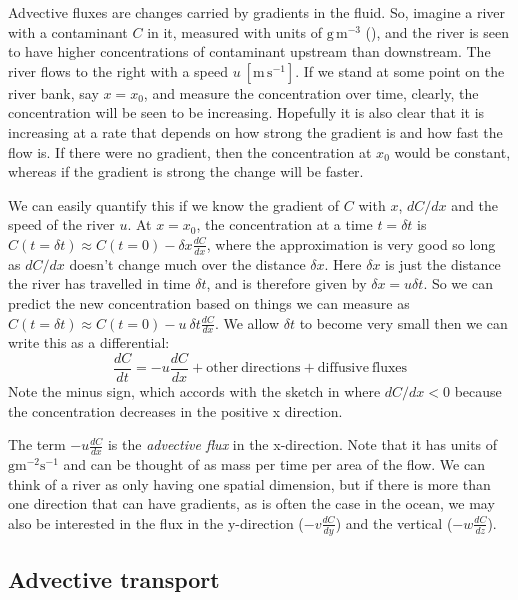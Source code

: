 Advective fluxes are changes carried by gradients in the fluid.  So, imagine a river with a contaminant $C$ in it, measured with units of $\mathrm{g\,m^{-3}}$ (), and the river is seen to have higher concentrations of contaminant upstream than downstream.    The river flows to the right with a speed $u\ \mathrm{[m\,s^{-1}]}$.   If we stand at some point on the river bank, say $x = x_0$, and measure the concentration over time, clearly, the concentration will be seen to be increasing.  Hopefully it is also clear that it is increasing at a rate that depends on how strong the gradient is and how fast the flow is.  If there were no gradient, then the concentration at $x_0$ would be constant, whereas if the gradient is strong the change will be faster.  

We can easily quantify this if we know the gradient of $C$ with $x$, $dC/dx$ and the speed of the river $u$.  At $x=x_0$, the concentration at a time $t=\delta t$ is
$C(t=\delta t) \approx C(t=0) - \delta x \frac{dC}{dx}$, where the approximation is very good so long as $dC/dx$ doesn't change much over the distance $\delta x$.  Here $\delta x$ is just the distance the river has travelled in time $\delta t$, and is therefore given by $\delta x = u \delta t$.  So we can predict the new concentration based on things we can measure as  $C(t=\delta t) \approx C(t=0) - u\ \delta t \frac{dC}{dx}$.  We allow $\delta t$ to become very small then we can write this as a differential:
\begin{equation}
\frac{dC}{dt} = -u \frac{dC}{dx} + \mathrm{other\ directions} + \mathrm{diffusive\ fluxes}    
\end{equation}
Note the minus sign, which accords with the sketch in  where $dC/dx < 0$ because the concentration decreases in the positive x direction.  

The term $-u\frac{dC}{dx}$ is the \emph{advective flux} in the x-direction.  Note that it has units of $\mathrm{g m^{-2}s^{-1}}$ and can be thought of as mass per time per area of the flow.   We can think of a river as only having one spatial dimension, but if there is more than one direction that can have gradients, as is often the case in the ocean, we may also be interested in the flux in the y-direction ($-v\frac{dC}{dy}$) and the vertical ($-w\frac{dC}{dz}$).  

\subsection{Advective transport} 

